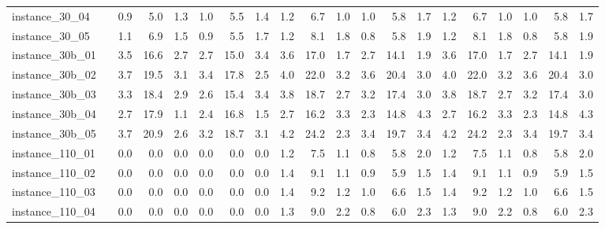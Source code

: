 \documentclass[12pt,a4paper,openright,twoside]{book}
\begin{document}
\begin{table}[H]
{\begin{tabular}{|ll|rrrrrr|rrrrrr|rrrrrr|}
 instance\_30\_04             &     &     0.9  &   5.0  &  1.3  &   1.0  &   5.5  &  1.4  &           1.2  &   6.7  &  1.0  &   1.0  &   5.8  &  1.7  &    1.2  &   6.7  &  1.0  &   1.0  &   5.8  &  1.7   \\   
 instance\_30\_05             &     &     1.1  &   6.9  &  1.5  &   0.9  &   5.5  &  1.7  &           1.2  &   8.1  &  1.8  &   0.8  &   5.8  &  1.9  &    1.2  &   8.1  &  1.8  &   0.8  &   5.8  &  1.9   \\   
 instance\_30b\_01             &     &     3.5  &   16.6  &  2.7  &   2.7  &   15.0  &  3.4  &         3.6  &   17.0  &  1.7  &   2.7  &   14.1  &  1.9  &    3.6  &   17.0  &  1.7  &   2.7  &   14.1  &  1.9   \\   
 instance\_30b\_02             &     &     3.7  &   19.5  &  3.1  &   3.4  &   17.8  &  2.5  &         4.0  &   22.0  &  3.2  &   3.6  &   20.4  &  3.0  &    4.0  &   22.0  &  3.2  &   3.6  &   20.4  &  3.0   \\   
 instance\_30b\_03             &     &     3.3  &   18.4  &  2.9  &   2.6  &   15.4  &  3.4  &         3.8  &   18.7  &  2.7  &   3.2  &   17.4  &  3.0  &    3.8  &   18.7  &  2.7  &   3.2  &   17.4  &  3.0   \\   
 instance\_30b\_04             &     &     2.7  &   17.9  &  1.1  &   2.4  &   16.8  &  1.5  &         2.7  &   16.2  &  3.3  &   2.3  &   14.8  &  4.3  &    2.7  &   16.2  &  3.3  &   2.3  &   14.8  &  4.3   \\     
 instance\_30b\_05             &     &     3.7  &   20.9  &  2.6  &   3.2  &   18.7  &  3.1  &         4.2  &   24.2  &  2.3  &   3.4  &   19.7  &  3.4  &    4.2  &   24.2  &  2.3  &   3.4  &   19.7  &  3.4   \\   
 instance\_110\_01            &     &     0.0  &   0.0  &  0.0  &   0.0  &   0.0  &  0.0  &            1.2  &   7.5  &  1.1  &   0.8  &   5.8  &  2.0  &      1.2  &   7.5  &  1.1  &   0.8  &   5.8  &  2.0    \\   
 instance\_110\_02            &     &     0.0  &   0.0  &  0.0  &   0.0  &   0.0  &  0.0  &            1.4  &   9.1  &  1.1  &   0.9  &   5.9  &  1.5  &      1.4  &   9.1  &  1.1  &   0.9  &   5.9  &  1.5    \\   
 instance\_110\_03            &     &     0.0  &   0.0  &  0.0  &   0.0  &   0.0  &  0.0  &     1.4  &   9.2  &  1.2  &   1.0  &   6.6  &  1.5  &      1.4  &   9.2  &  1.2  &   1.0  &   6.6  &  1.5    \\      
 instance\_110\_04            &     &     0.0  &   0.0  &  0.0  &   0.0  &   0.0  &  0.0  &        1.3  &   9.0  &  2.2  &   0.8  &   6.0  &  2.3  &      1.3  &   9.0  &  2.2  &   0.8  &   6.0  &  2.3    \\  

\end{tabular}}
\end{table}
\end{document}
